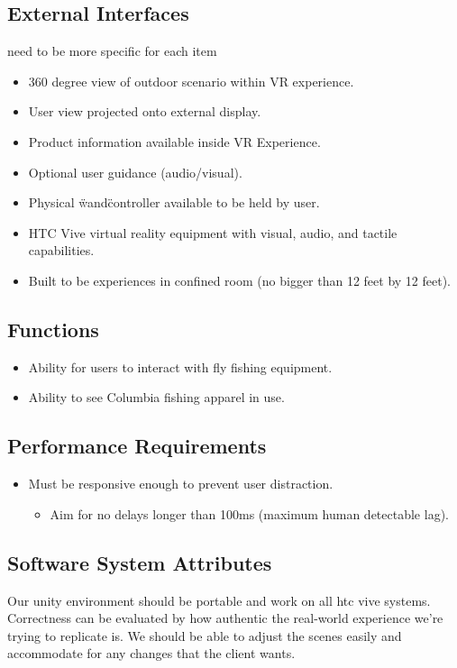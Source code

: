 \documentclass[10pt,journal,compsoc,onecolumn]{IEEEtran}
\begin{document}
\subsection{External Interfaces}
need to be more specific for each item
\begin{itemize}
  \item 360 degree view of outdoor scenario within VR experience.
  \item User view projected onto external display.
  \item Product information available inside VR Experience.
  \item Optional user guidance (audio/visual).
  \item Physical \"wand\" controller available to be held by user.
  \item HTC Vive virtual reality equipment with visual, audio, and tactile capabilities.
  \item Built to be experiences in confined room (no bigger than 12 feet by 12 feet).
\end{itemize}

\subsection{Functions}
\begin{itemize}
  \item Ability for users to interact with fly fishing equipment.
  \item Ability to see Columbia fishing apparel in use.
\end{itemize}

\subsection{Performance Requirements}
\begin{itemize}
  \item Must be responsive enough to prevent user distraction.
  \begin{itemize}
    \item Aim for no delays longer than 100ms (maximum human detectable lag).
  \end{itemize}
\end{itemize}

\subsection{Software System Attributes}
Our unity environment should be portable and work on all htc vive systems.
Correctness can be evaluated by how authentic the real-world experience we're
trying to replicate is. We should be able to adjust the scenes easily and
accommodate for any changes that the client wants.
\end{document}
